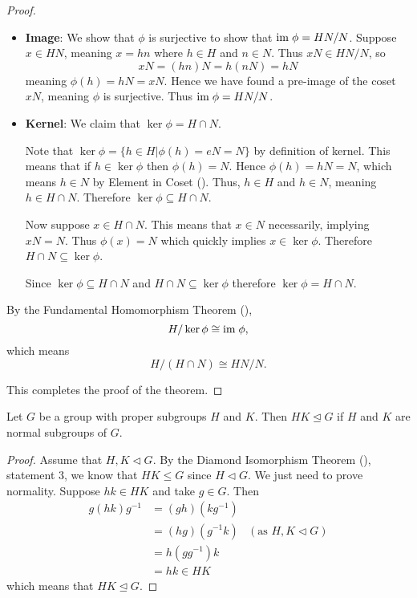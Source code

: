 \begin{proof}
\begin{enumerate}
\begin{itemize}
            \item \textbf{Image}: We show that $\phi$ is surjective to show that $\mathrm{im}\;\phi = HN/N$. Suppose $x \in HN$, meaning $x = hn$ where $h \in H$ and $n \in N$. Thus $xN \in HN/N$, so
            \[
                xN = (hn)N = h(nN) = hN
            \]
            meaning $\phi(h) = hN = xN$. Hence we have found a pre-image of the coset $xN$, meaning $\phi$ is surjective. Thus $\mathrm{im}\; \phi = HN/N$.

            \item \textbf{Kernel}: We claim that $\ker\phi = H \cap N$.
            
            Note that $\ker\phi = \{h \in H \vert \phi(h) = eN = N\}$ by definition of kernel. This means that if $h \in \ker\phi$ then $\phi(h) = N$. Hence $\phi(h) = hN = N$, which means $h \in N$ by Element in Coset (). Thus, $h \in H$ and $h \in N$, meaning $h \in H \cap N$. Therefore $\ker \phi \subseteq H \cap N$.
    
            Now suppose $x \in H \cap N$. This means that $x \in N$ necessarily, implying $xN = N$. Thus $\phi(x) = N$ which quickly implies $x \in \ker\phi$. Therefore $H \cap N \subseteq \ker\phi$.
    
            Since $\ker \phi \subseteq H \cap N$ and  $H \cap N \subseteq \ker\phi$ therefore $\ker\phi = H\cap N$.
        \end{itemize}

        By the Fundamental Homomorphism Theorem (),
        \[
            H / \ker\phi \cong \mathrm{im}\; \phi,
        \]
        which means
        \[
            H/(H\cap N) \cong HN/N.
        \]
    \end{enumerate}
    This completes the proof of the theorem.
\end{proof}

\begin{corollary}\label{corollary-subgroup-product-is-normal-subgroup-if-subgroups-are-normal}
    Let $G$ be a group with proper subgroups $H$ and $K$. Then $HK \unlhd G$ if $H$ and $K$ are normal subgroups of $G$.
\end{corollary}
\begin{proof}
    Assume that $H, K \lhd G$. By the Diamond Isomorphism Theorem (), statement 3, we know that $HK \leq G$ since $H \lhd G$. We just need to prove normality. Suppose $hk \in HK$ and take $g \in G$. Then
    \begin{align*}
        g(hk)g^{-1} &= (gh)(kg^{-1})\\
        &= (hg)(g^{-1}k) & (\text{as } H, K \lhd G)\\
        &= h(gg^{-1})k\\
        &= hk \in HK
    \end{align*}
    which means that $HK \unlhd G$.
\end{proof}

